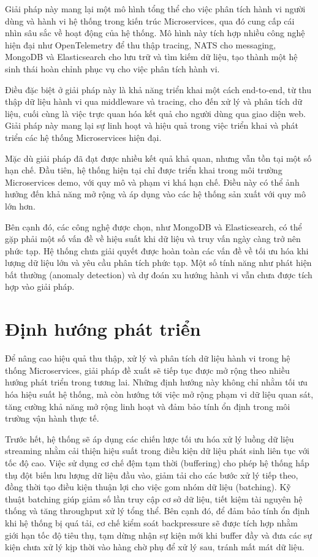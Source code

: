 \documentclass{uetgraduation}
\begin{document}
Giải pháp này mang lại một mô hình tổng thể cho việc phân tích hành vi người dùng và hành vi hệ thống trong kiến trúc Microservices, qua đó cung cấp cái nhìn sâu sắc về hoạt động của hệ thống. Mô hình này tích hợp nhiều công nghệ hiện đại như OpenTelemetry để thu thập tracing, NATS cho messaging, MongoDB và Elasticsearch cho lưu trữ và tìm kiếm dữ liệu, tạo thành một hệ sinh thái hoàn chỉnh phục vụ cho việc phân tích hành vi.

Điều đặc biệt ở giải pháp này là khả năng triển khai một cách end-to-end, từ thu thập dữ liệu hành vi qua middleware và tracing, cho đến xử lý và phân tích dữ liệu, cuối cùng là việc trực quan hóa kết quả cho người dùng qua giao diện web. Giải pháp này mang lại sự linh hoạt và hiệu quả trong việc triển khai và phát triển các hệ thống Microservices hiện đại.

Mặc dù giải pháp đã đạt được nhiều kết quả khả quan, nhưng vẫn tồn tại một số hạn chế. Đầu tiên, hệ thống hiện tại chỉ được triển khai trong môi trường Microservices demo, với quy mô và phạm vi khá hạn chế. Điều này có thể ảnh hưởng đến khả năng mở rộng và áp dụng vào các hệ thống sản xuất với quy mô lớn hơn.

Bên cạnh đó, các công nghệ được chọn, như MongoDB và Elasticsearch, có thể gặp phải một số vấn đề về hiệu suất khi dữ liệu và truy vấn ngày càng trở nên phức tạp. Hệ thống chưa giải quyết được hoàn toàn các vấn đề về tối ưu hóa khi lượng dữ liệu lớn và yêu cầu phân tích phức tạp. Một số tính năng như phát hiện bất thường (anomaly detection) và dự đoán xu hướng hành vi vẫn chưa được tích hợp vào giải pháp.

\section{Định hướng phát triển}

Để nâng cao hiệu quả thu thập, xử lý và phân tích dữ liệu hành vi trong hệ thống Microservices, giải pháp đề xuất sẽ tiếp tục được mở rộng theo nhiều hướng phát triển trong tương lai. Những định hướng này không chỉ nhằm tối ưu hóa hiệu suất hệ thống, mà còn hướng tới việc mở rộng phạm vi dữ liệu quan sát, tăng cường khả năng mở rộng linh hoạt và đảm bảo tính ổn định trong môi trường vận hành thực tế.

Trước hết, hệ thống sẽ áp dụng các chiến lược tối ưu hóa xử lý luồng dữ liệu streaming nhằm cải thiện hiệu suất trong điều kiện dữ liệu phát sinh liên tục với tốc độ cao. Việc sử dụng cơ chế đệm tạm thời (buffering) cho phép hệ thống hấp thụ đột biến lưu lượng dữ liệu đầu vào, giảm tải cho các bước xử lý tiếp theo, đồng thời tạo điều kiện thuận lợi cho việc gom nhóm dữ liệu (batching). Kỹ thuật batching giúp giảm số lần truy cập cơ sở dữ liệu, tiết kiệm tài nguyên hệ thống và tăng throughput xử lý tổng thể. Bên cạnh đó, để đảm bảo tính ổn định khi hệ thống bị quá tải, cơ chế kiểm soát backpressure sẽ được tích hợp nhằm giới hạn tốc độ tiêu thụ, tạm dừng nhận sự kiện mới khi buffer đầy và đưa các sự kiện chưa xử lý kịp thời vào hàng chờ phụ để xử lý sau, tránh mất mát dữ liệu.
\end{document}
